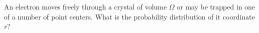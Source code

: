 

An electron moves freely through a crystal of volume $\Omega$ or may be trapped in one of a number of point centers.
What is the probability distribution of it coordinate $r$?

